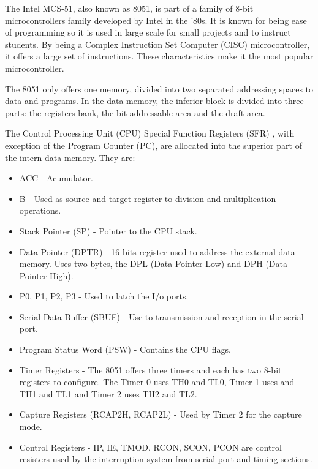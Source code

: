 \documentclass[11pt]{report}
\begin{document}
		\par The Intel MCS-51, also known as 8051, is part of a family of 8-bit microcontrollers family developed by Intel in the '80s. It is known for being ease of programming so it is used in large scale for small projects and to instruct students. By being a Complex Instruction Set Computer (CISC) microcontroller, it offers a large set of instructions. These characteristics make it the most popular microcontroller.
		\par The 8051 only offers one memory, divided into two separated addressing spaces to data and programs. In the data memory, the inferior block is divided into three parts: the registers bank, the bit addressable area and the draft area.
		\par The Control Processing Unit (CPU) Special Function Registers (SFR) , with exception of the Program Counter (PC), are allocated into the superior part of the intern data memory.  They are:
		\begin{itemize}
			\item ACC - Acumulator.
			\item B - Used as source and target register to division and multiplication operations.
			\item Stack Pointer (SP) - Pointer to the CPU stack.
			\item Data Pointer (DPTR) - 16-bits register used to address the external data memory. Uses two bytes, the DPL (Data Pointer Low) and DPH (Data Pointer High).
			\item P0, P1, P2, P3 - Used to latch the I/o ports.
			\item Serial Data Buffer (SBUF) - Use to transmission and reception in the serial port.
			\item Program Status Word (PSW) - Contains the CPU flags.
			\item Timer Registers - The 8051 offers three timers and each has two 8-bit registers to configure. The Timer 0 uses TH0 and TL0, Timer 1 uses and TH1 and TL1 and Timer 2 uses TH2 and TL2.
			\item Capture Registers (RCAP2H, RCAP2L) - Used by Timer 2 for the capture mode.
			\item Control Registers - IP, IE, TMOD, RCON, SCON, PCON are control resisters used by the interruption system from serial port and timing sections. 
		\end{itemize}
		
\end{document}
